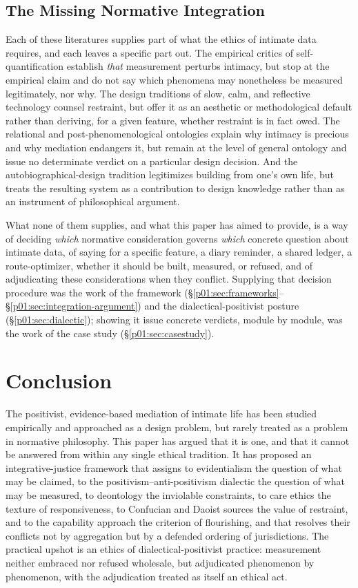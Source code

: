 \subsection{The Missing Normative Integration}

Each of these literatures supplies part of what the ethics of intimate data requires, and each leaves a specific part out. The empirical critics of self-quantification establish \emph{that} measurement perturbs intimacy, but stop at the empirical claim and do not say which phenomena may nonetheless be measured legitimately, nor why. The design traditions of slow, calm, and reflective technology counsel restraint, but offer it as an aesthetic or methodological default rather than deriving, for a given feature, whether restraint is in fact owed. The relational and post-phenomenological ontologies explain why intimacy is precious and why mediation endangers it, but remain at the level of general ontology and issue no determinate verdict on a particular design decision. And the autobiographical-design tradition legitimizes building from one's own life, but treats the resulting system as a contribution to design knowledge rather than as an instrument of philosophical argument.

What none of them supplies, and what this paper has aimed to provide, is a way of deciding \emph{which} normative consideration governs \emph{which} concrete question about intimate data, of saying for a specific feature, a diary reminder, a shared ledger, a route-optimizer, whether it should be built, measured, or refused, and of adjudicating these considerations when they conflict. Supplying that decision procedure was the work of the framework (§\ref{p01:sec:frameworks}--§\ref{p01:sec:integration-argument}) and the dialectical-positivist posture (§\ref{p01:sec:dialectic}); showing it issue concrete verdicts, module by module, was the work of the case study (§\ref{p01:sec:casestudy}).

\section{Conclusion}\label{p01:sec:conclusion}

The positivist, evidence-based mediation of intimate life has been studied empirically and approached as a design problem, but rarely treated as a problem in normative philosophy. This paper has argued that it is one, and that it cannot be answered from within any single ethical tradition. It has proposed an integrative-justice framework that assigns to evidentialism the question of what may be claimed, to the positivism--anti-positivism dialectic the question of what may be measured, to deontology the inviolable constraints, to care ethics the texture of responsiveness, to Confucian and Daoist sources the value of restraint, and to the capability approach the criterion of flourishing, and that resolves their conflicts not by aggregation but by a defended ordering of jurisdictions. The practical upshot is an ethics of dialectical-positivist practice: measurement neither embraced nor refused wholesale, but adjudicated phenomenon by phenomenon, with the adjudication treated as itself an ethical act.

